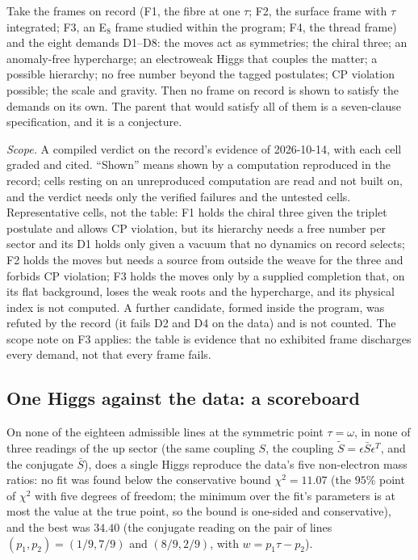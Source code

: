 \begin{verdict}[N4; B1652]\label{bd:tribunal}
Take the frames on record (F1, the fibre at one $\tau$; F2, the surface frame with $\tau$ integrated; F3, an E$_8$
frame studied within the program; F4, the thread frame) and the eight demands D1--D8: the moves act as symmetries; the chiral
three; an anomaly-free hypercharge; an electroweak Higgs that couples the matter; a possible hierarchy; no free number
beyond the tagged postulates; CP violation possible; the scale and gravity. Then no frame on record is shown to
satisfy the demands on its own. The parent that would satisfy all of them is a seven-clause specification, and it is a
conjecture.
\end{verdict}

\emph{Scope.} A compiled verdict on the record's evidence of 2026-10-14, with each cell graded and cited. ``Shown''
means shown by a computation reproduced in the record; cells resting on an unreproduced computation are read and not
built on, and the
verdict needs only the verified failures and the untested cells. Representative cells, not the table:
F1 holds the chiral three given the triplet postulate and allows CP violation, but its hierarchy needs a free number
per sector and its D1 holds only given a vacuum that no dynamics on record selects; F2 holds the moves but needs a
source from outside the weave for the three and forbids CP violation; F3 holds the moves only by a supplied completion
that, on its flat background, loses the weak roots and the hypercharge, and its physical index is not computed. A
further candidate, formed inside the program, was refuted by the record (it fails D2 and D4 on the data) and is not
counted. The scope note on F3 applies: the table is evidence that no exhibited frame discharges every demand,
not that every frame fails.

\subsection{One Higgs against the data: a scoreboard}

\begin{scoreboard}\label{bd:census}
On none of the eighteen admissible lines at the symmetric point $\tau=\omega$, in none of three readings of the up
sector (the same coupling $S$, the coupling $\tilde S=\epsilon\bar S\epsilon^{T}$, and the conjugate $\bar S$), does a single Higgs reproduce the data's five
non-electron mass ratios: no fit was found below the conservative bound $\chi^2=11.07$ (the $95\%$ point of $\chi^2$
with five degrees of freedom; the minimum over the fit's parameters is at most the value at the true point, so the bound
is one-sided and conservative), and the best was $34.40$ (the
conjugate reading on the pair of lines $(p_1,p_2)=(1/9,7/9)$ and $(8/9,2/9)$, with $w=p_1\tau-p_2$).
\end{scoreboard}

